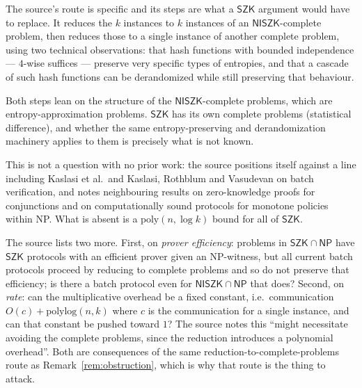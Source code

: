 \documentclass{conjura-conjecture}
\newcommand{\NISZK}{\mathsf{NISZK}}
\newcommand{\SZK}{\mathsf{SZK}}
\begin{document}
\begin{remark}\label{rem:obstruction}
The source's route is specific and its steps are what a $\SZK$ argument
would have to replace. It reduces the $k$ instances to $k$ instances of
an $\NISZK$-complete problem, then reduces those to a single instance of
another complete problem, using two technical observations: that hash
functions with bounded independence --- $4$-wise suffices --- preserve very
specific types of entropies, and that a cascade of such hash functions
can be derandomized while still preserving that behaviour.

Both steps lean on the structure of the $\NISZK$-complete problems, which
are entropy-approximation problems. $\SZK$ has its own complete problems
(statistical difference), and whether the same entropy-preserving and
derandomization machinery applies to them is precisely what is not known.
\end{remark}

\begin{remark}\label{rem:prior}
This is not a question with no prior work: the source positions itself
against a line including Kaslasi et al.\ and Kaslasi, Rothblum and
Vasudevan on batch verification, and notes neighbouring results on
zero-knowledge proofs for conjunctions and on computationally sound
protocols for monotone policies within NP\@. What is absent is a
$\mathrm{poly}(n, \log k)$ bound for all of $\SZK$.
\end{remark}

\begin{remark}\label{rem:neighbours}
The source lists two more. First, on \emph{prover efficiency}: problems in
$\SZK \cap \mathsf{NP}$ have $\SZK$ protocols with an efficient prover given an
NP-witness, but all current batch protocols proceed by reducing to
complete problems and so do not preserve that efficiency; is there a
batch protocol even for $\NISZK \cap \mathsf{NP}$ that does? Second, on \emph{rate}:
can the multiplicative overhead be a fixed constant, i.e.\ communication
$O(c) + \mathrm{polylog}(n,k)$ where $c$ is the communication for a
single instance, and can that constant be pushed toward $1$? The source
notes this ``might necessitate avoiding the complete problems, since the
reduction introduces a polynomial overhead''. Both are consequences of
the same reduction-to-complete-problems route as
Remark~\ref{rem:obstruction}, which is why that route is the thing to
attack.
\end{remark}
\end{document}
